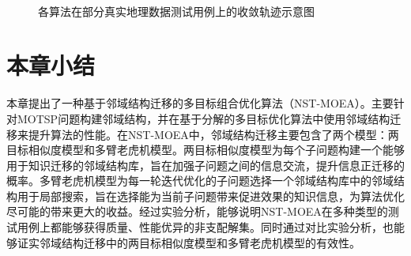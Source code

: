 \begin{figure}[!h]
     \quad
    \\
     \quad
    \caption[各算法在部分真实地理数据测试用例上的收敛轨迹示意图]{各算法在部分真实地理数据测试用例上的收敛轨迹示意图}
    \label{fig:各算法在部分真实地理数据测试用例上的收敛轨迹示意图}
\end{figure}

\section{本章小结}
\label{sec:NST:本章小结}
本章提出了一种基于邻域结构迁移的多目标组合优化算法（NST-MOEA）。主要针对MOTSP问题构建邻域结构，并在基于分解的多目标优化算法中使用邻域结构迁移来提升算法的性能。在NST-MOEA中，邻域结构迁移主要包含了两个模型：两目标相似度模型和多臂老虎机模型。两目标相似度模型为每个子问题构建一个能够用于知识迁移的邻域结构库，旨在加强子问题之间的信息交流，提升信息正迁移的概率。多臂老虎机模型为每一轮迭代优化的子问题选择一个邻域结构库中的邻域结构用于局部搜索，旨在选择能为当前子问题带来促进效果的知识信息，为算法优化尽可能的带来更大的收益。经过实验分析，能够说明NST-MOEA在多种类型的测试用例上都能够获得质量、性能优异的非支配解集。同时通过对比实验分析，也能够证实邻域结构迁移中的两目标相似度模型和多臂老虎机模型的有效性。